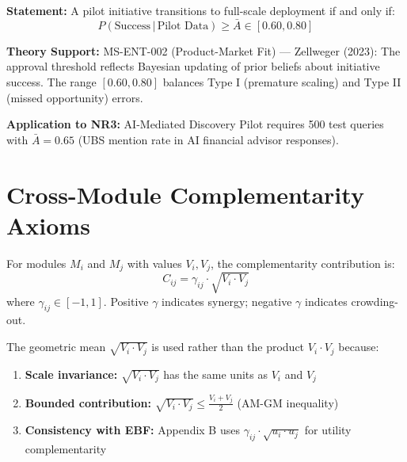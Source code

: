 \begin{tcolorbox}[colback=gray!5!white, colframe=gray!75!black,
    title=Axiom AIM-20: Approval Threshold for Scaling]
\label{ax:aim-20}

\textbf{Statement:}
A pilot initiative transitions to full-scale deployment if and only if:
\begin{equation}
P(\text{Success} \,|\, \text{Pilot Data}) \geq \bar{A} \in [0.60, 0.80]
\label{eq:aim-approval}
\end{equation}

\textbf{Theory Support:} MS-ENT-002 (Product-Market Fit) --- Zellweger (2023):
The approval threshold reflects Bayesian updating of prior beliefs about
initiative success. The range $[0.60, 0.80]$ balances Type I (premature scaling)
and Type II (missed opportunity) errors.

\textbf{Application to NR3:} AI-Mediated Discovery Pilot requires 500 test
queries with $\bar{A} = 0.65$ (UBS mention rate in AI financial advisor responses).
\end{tcolorbox}


\section{Cross-Module Complementarity Axioms}
\label{sec:aim-cross}

\begin{definition}
\label{def:aim-cross-module}
For modules $M_i$ and $M_j$ with values $V_i, V_j$, the complementarity
contribution is:
\begin{equation}
C_{ij} = \gamma_{ij} \cdot \sqrt{V_i \cdot V_j}
\label{eq:aim-complementarity}
\end{equation}
where $\gamma_{ij} \in [-1, 1]$. Positive $\gamma$ indicates synergy;
negative $\gamma$ indicates crowding-out.
\end{definition}

\begin{tcolorbox}[colback=red!5!white, colframe=red!75!black,
    title=Fundamental Question: Why $\sqrt{V_i \cdot V_j}$ and not $V_i \cdot V_j$?]

The geometric mean $\sqrt{V_i \cdot V_j}$ is used rather than the product
$V_i \cdot V_j$ because:
\begin{enumerate}[nosep]
\item \textbf{Scale invariance:} $\sqrt{V_i \cdot V_j}$ has the same units as $V_i$ and $V_j$
\item \textbf{Bounded contribution:} $\sqrt{V_i \cdot V_j} \leq \frac{V_i + V_j}{2}$ (AM-GM inequality)
\item \textbf{Consistency with EBF:} Appendix B uses $\gamma_{ij} \cdot \sqrt{u_i \cdot u_j}$
for utility complementarity
\end{enumerate}
\end{tcolorbox}


